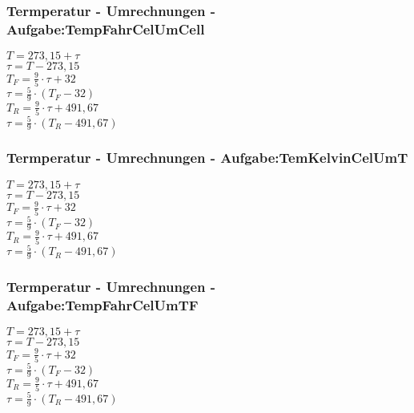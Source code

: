 \subsubsection{Termperatur - Umrechnungen - Aufgabe:TempFahrCelUmCell} 
\begin{minipage}{0.45\textwidth} 
$ T = 273,15 + \tau $\\ 
$ \tau  = T-273,15 $\\ 
$ T_{F}  = \frac{9}{5}\cdot \tau  +32 $\\ 
$ \tau  = \frac{5}{9}\cdot (T_{F}  - 32) $\\ 
$ T_{R}  = \frac{9}{5}\cdot \tau  + 491,67 $\\ 
$ \tau  = \frac{5}{9}\cdot (T_{R}  - 491,67) $\\ 
\end{minipage} 
\begin{minipage}{0.45\textwidth} 
 
\end{minipage} 
\subsubsection{Termperatur - Umrechnungen - Aufgabe:TemKelvinCelUmT} 
\begin{minipage}{0.45\textwidth} 
$ T = 273,15 + \tau $\\ 
$ \tau  = T-273,15 $\\ 
$ T_{F}  = \frac{9}{5}\cdot \tau  +32 $\\ 
$ \tau  = \frac{5}{9}\cdot (T_{F}  - 32) $\\ 
$ T_{R}  = \frac{9}{5}\cdot \tau  + 491,67 $\\ 
$ \tau  = \frac{5}{9}\cdot (T_{R}  - 491,67) $\\ 
\end{minipage} 
\begin{minipage}{0.45\textwidth} 
 
\end{minipage} 
\subsubsection{Termperatur - Umrechnungen - Aufgabe:TempFahrCelUmTF} 
\begin{minipage}{0.45\textwidth} 
$ T = 273,15 + \tau $\\ 
$ \tau  = T-273,15 $\\ 
$ T_{F}  = \frac{9}{5}\cdot \tau  +32 $\\ 
$ \tau  = \frac{5}{9}\cdot (T_{F}  - 32) $\\ 
$ T_{R}  = \frac{9}{5}\cdot \tau  + 491,67 $\\ 
$ \tau  = \frac{5}{9}\cdot (T_{R}  - 491,67) $\\ 
\end{minipage} 
\begin{minipage}{0.45\textwidth} 
 
\end{minipage} 
